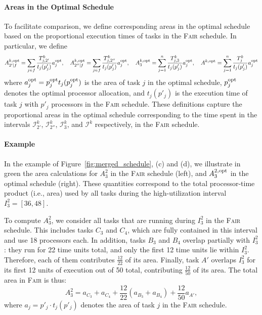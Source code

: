 \documentclass{article}
\newcommand\fair{\textsc{Fair}\xspace}
\newcommand\opt{\textnormal{opt}\xspace}
\begin{document}
\paragraph{Areas in the Optimal Schedule}
To facilitate comparison, we define corresponding areas in the optimal schedule based on the proportional execution times of tasks in the \textsc{Fair} schedule. In particular, we define
\[
A^{k,\opt}_{2'|f} = \sum_{j \in f} \frac{T_{j,2'}^{k}}{t_j(p'_j)} a_j^{\opt},\quad
A^{k,\opt}_{2''|f} = \sum_{j \in f} \frac{T_{j,2''}^{k}}{t_j(p'_j)} a_j^{\opt},\quad
A^{k,\opt}_{3} = \sum_{j=1}^{n} \frac{T_{j,3}^{k}}{t_j(p'_j)} a_j^{\opt},\quad 
A^{k,\opt} = \sum_{j=1}^{n} \frac{T_{j}^{k}}{t_j(p'_j)} a_j^{\opt}
\]
where \(a_j^{\opt} = p_j^{\opt} t_j(p_j^{\opt})\) is the area of task \(j\) in the optimal schedule, \(p_j^{\opt}\) denotes the optimal processor allocation, and \(t_j(p'_j)\) is the execution time of task \(j\) with \(p'_j\) processors in the \textsc{Fair} schedule. These definitions capture the proportional areas in the optimal schedule corresponding to the time spent in the intervals \(\mathcal{I}_{2'}^{k}\), \(\mathcal{I}_{2''}^{k}\), \(\mathcal{I}_{3}^{k}\), and \(\mathcal{I}^{k}\) respectively, in the \fair schedule.



\paragraph{Example}

In the example of Figure~\ref{fig:merged_schedule}, (c) and (d), we illustrate in green the area calculations for $A_3^2$ in the \textsc{Fair} schedule (left), and $A_3^{2,\opt}$ in the optimal schedule (right). These quantities correspond to the total processor-time product (i.e., area) used by all tasks during the high-utilization interval $I_3^2 = [36,48]$.

To compute $A_3^2$, we consider all tasks that are running during $I_3^2$ in the \textsc{Fair} schedule. This includes tasks $C_3$ and $C_4$, which are fully contained in this interval and use 18 processors each. In addition, tasks $B_3$ and $B_4$ overlap partially with $I_3^2$: they run for 22 time units total, and only the first 12 time units lie within $I_3^2$. Therefore, each of them contributes $\frac{12}{22}$ of its area. Finally, task $A'$ overlaps $I_3^2$ for its first 12 units of execution out of 50 total, contributing $\frac{12}{50}$ of its area. The total area in \textsc{Fair} is thus:
\[
A_3^2 = a_{C_3} + a_{C_4} + \frac{12}{22}(a_{B_3} + a_{B_4}) + \frac{12}{50} a_{A'},
\]
where $a_j = p'_j \cdot t_j(p'_j)$ denotes the area of task $j$ in the \textsc{Fair} schedule.
\end{document}

